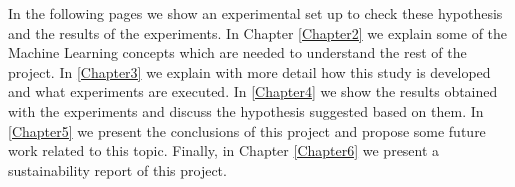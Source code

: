 \begin{pre-delivery}
  In the following pages we show an experimental set up to check these
  hypothesis and the results of the experiments. In Chapter \ref{Chapter2} we
  explain some of the Machine Learning concepts which are needed to understand
  the rest of the project. In \ref{Chapter3} we explain with more detail how
  this study is developed and what experiments are executed. In \ref{Chapter4}
  we show the results obtained with the experiments and discuss the hypothesis
  suggested based on them. In \ref{Chapter5} we present the conclusions of
  this project and propose some future work related to this topic. Finally,
  in Chapter \ref{Chapter6} we present a sustainability report of this project.

\end{pre-delivery}
